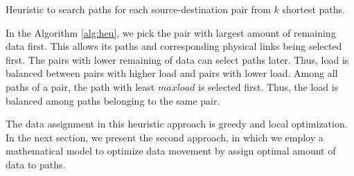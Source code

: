 \begin{algorithm}%
\SetAlgoLined\DontPrintSemicolon
{}

\caption{Heuristic to search paths for each source-destination pair from $k$ shortest paths.}
\label{alg:heu}
\end{algorithm}

In the Algorithm \ref{alg:heu}, we pick the pair with largest amount of remaining data first. This allows its paths and corresponding physical links being selected first. The pairs with lower remaining of data can select paths later.  Thus, load is balanced between pairs with higher load and pairs with lower load. Among all paths of a pair, the path with least $maxload$ is selected first. Thus, the load is balanced among paths belonging to the same pair.

The data assignment in this heuristic approach is greedy and local optimization. In the next section, we present the second approach, in which we employ a mathematical model to optimize data movement by assign optimal amount of data to paths.


